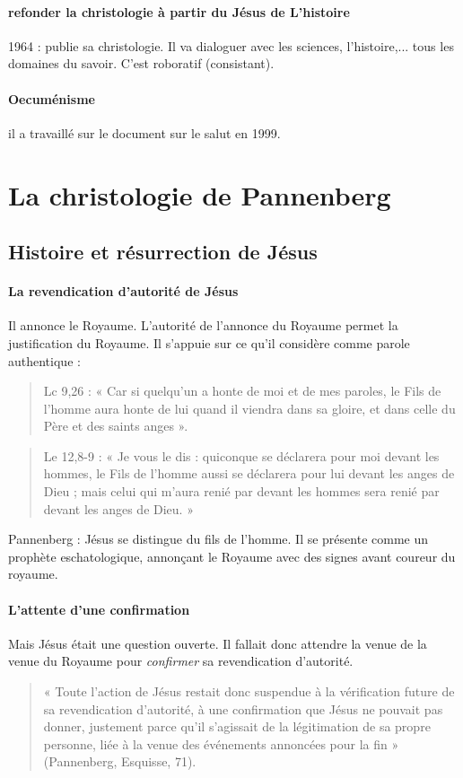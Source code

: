 \paragraph{refonder la christologie à partir du Jésus de L'histoire} 1964 : publie sa christologie. Il va dialoguer avec les sciences, l'histoire,... tous les domaines du savoir. C'est roboratif (consistant). 

\paragraph{Oecuménisme} il a travaillé sur le document sur le salut en 1999. 


\section{La christologie de Pannenberg}

 \subsection{Histoire et résurrection de Jésus}

\paragraph{La revendication d’autorité de Jésus} Il annonce le Royaume. L'autorité de l'annonce du Royaume permet la justification du Royaume. Il s'appuie sur ce qu'il considère comme parole authentique : 
\begin{quote}
    Lc 9,26 : « Car si quelqu’un a honte de moi et de mes paroles, le Fils de l’homme aura honte
de lui quand il viendra dans sa gloire, et dans celle du Père et des saints anges ».
\end{quote}
\begin{quote}
    Le 12,8-9 : « Je vous le dis : quiconque se déclarera pour moi devant les hommes, le Fils de
l’homme aussi se déclarera pour lui devant les anges de Dieu ; mais celui qui m’aura renié par
devant les hommes sera renié par devant les anges de Dieu. »
\end{quote}
Pannenberg : Jésus se distingue du fils de l'homme. Il se présente comme un prophète eschatologique, annonçant le Royaume avec des signes avant coureur du royaume.  

\paragraph{L’attente d’une confirmation} Mais Jésus était une question ouverte. Il fallait donc attendre la venue de la venue du Royaume pour \textit{confirmer} sa revendication d'autorité. 
\begin{quote}
    « Toute l’action de Jésus restait donc suspendue à la vérification future de sa revendication
d’autorité, à une confirmation que Jésus ne pouvait pas donner, justement parce qu’il
s’agissait de la légitimation de sa propre personne, liée à la venue des événements annoncées
pour la fin » (Pannenberg, Esquisse, 71).
\end{quote}

